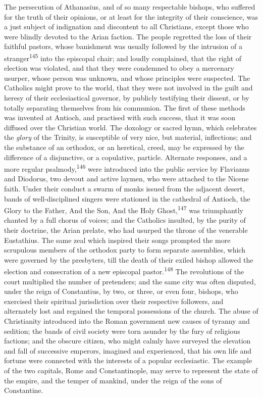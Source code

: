 The persecution of Athanasius, and of so many respectable
bishops, who suffered for the truth of their opinions, or at
least for the integrity of their conscience, was a just subject
of indignation and discontent to all Christians, except those who
were blindly devoted to the Arian faction. The people regretted
the loss of their faithful pastors, whose banishment was usually
followed by the intrusion of a stranger\textsuperscript{145} into the episcopal
chair; and loudly complained, that the right of election was
violated, and that they were condemned to obey a mercenary
usurper, whose person was unknown, and whose principles were
suspected. The Catholics might prove to the world, that they were
not involved in the guilt and heresy of their ecclesiastical
governor, by publicly testifying their dissent, or by totally
separating themselves from his communion. The first of these
methods was invented at Antioch, and practised with such success,
that it was soon diffused over the Christian world. The doxology
or sacred hymn, which celebrates the \textit{glory} of the Trinity, is
susceptible of very nice, but material, inflections; and the
substance of an orthodox, or an heretical, creed, may be
expressed by the difference of a disjunctive, or a copulative,
particle. Alternate responses, and a more regular psalmody,\textsuperscript{146}
were introduced into the public service by Flavianus and
Diodorus, two devout and active laymen, who were attached to the
Nicene faith. Under their conduct a swarm of monks issued from
the adjacent desert, bands of well-disciplined singers were
stationed in the cathedral of Antioch, the Glory to the Father,
And the Son, And the Holy Ghost,\textsuperscript{147} was triumphantly chanted by
a full chorus of voices; and the Catholics insulted, by the
purity of their doctrine, the Arian prelate, who had usurped the
throne of the venerable Eustathius. The same zeal which inspired
their songs prompted the more scrupulous members of the orthodox
party to form separate assemblies, which were governed by the
presbyters, till the death of their exiled bishop allowed the
election and consecration of a new episcopal pastor.\textsuperscript{148} The
revolutions of the court multiplied the number of pretenders; and
the same city was often disputed, under the reign of Constantius,
by two, or three, or even four, bishops, who exercised their
spiritual jurisdiction over their respective followers, and
alternately lost and regained the temporal possessions of the
church. The abuse of Christianity introduced into the Roman
government new causes of tyranny and sedition; the bands of civil
society were torn asunder by the fury of religious factions; and
the obscure citizen, who might calmly have surveyed the elevation
and fall of successive emperors, imagined and experienced, that
his own life and fortune were connected with the interests of a
popular ecclesiastic. The example of the two capitals, Rome and
Constantinople, may serve to represent the state of the empire,
and the temper of mankind, under the reign of the sons of
Constantine.

